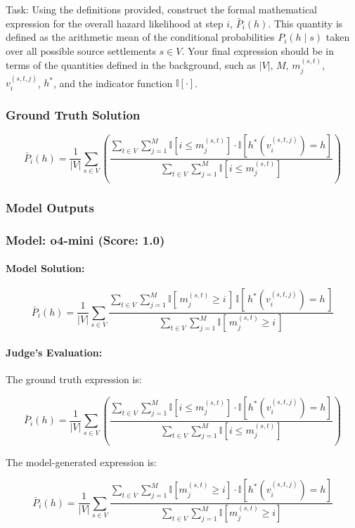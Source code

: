 \documentclass[10pt]{article}
\begin{document}
Task:
Using the definitions provided, construct the formal mathematical expression for the overall hazard likelihood at step $i$, $\bar{P}_i(h)$. This quantity is defined as the arithmetic mean of the conditional probabilities $P_i(h \mid s)$ taken over all possible source settlements $s \in V$. Your final expression should be in terms of the quantities defined in the background, such as $|V|$, $M$, $m_j^{(s,t)}$, $v_i^{(s,t,j)}$, $h^*$, and the indicator function $\mathbb{I}[\cdot]$.

\subsubsection*{Ground Truth Solution}
\[ \boxed{\bar{P}_i(h) = \frac{1}{|V|} \sum_{s \in V} \left( \frac{\sum_{t \in V} \sum_{j=1}^{M} \mathbb{I}[i \leq m_j^{(s,t)}] \cdot \mathbb{I}[h^*(v_i^{(s,t,j)}) = h]}{\sum_{t \in V} \sum_{j=1}^{M} \mathbb{I}[i \leq m_j^{(s,t)}]} \right)} \]

\subsubsection*{Model Outputs}
\subsubsection*{Model: o4-mini (Score: 1.0)}
\paragraph*{Model Solution:}
\[ \bar P_i(h)
=
\frac{1}{|V|}\sum_{s\in V}
\frac{
  \sum_{t\in V}\sum_{j=1}^{M}
    \mathbb{I}[\,m_j^{(s,t)}\ge i\,]\,
    \mathbb{I}[\,h^*(v_i^{(s,t,j)})=h\,]
}{
  \sum_{t\in V}\sum_{j=1}^{M}
    \mathbb{I}[\,m_j^{(s,t)}\ge i\,]
} \]

\paragraph*{Judge's Evaluation:}

The ground truth expression is:

\[
\bar{P}_i(h) = \frac{1}{|V|} \sum_{s \in V} \left( \frac{\sum_{t \in V} \sum_{j=1}^{M} \mathbb{I}[i \leq m_j^{(s,t)}] \cdot \mathbb{I}[h^*(v_i^{(s,t,j)}) = h]}{\sum_{t \in V} \sum_{j=1}^{M} \mathbb{I}[i \leq m_j^{(s,t)}]} \right)
\]

The model-generated expression is:

\[
\bar{P}_i(h) = \frac{1}{|V|} \sum_{s \in V} \frac{\sum_{t \in V} \sum_{j=1}^M \mathbb{I}[m_j^{(s,t)} \geq i] \cdot \mathbb{I}[h^*(v_i^{(s,t,j)}) = h]}{\sum_{t \in V} \sum_{j=1}^M \mathbb{I}[m_j^{(s,t)} \geq i]}
\]
\end{document}
